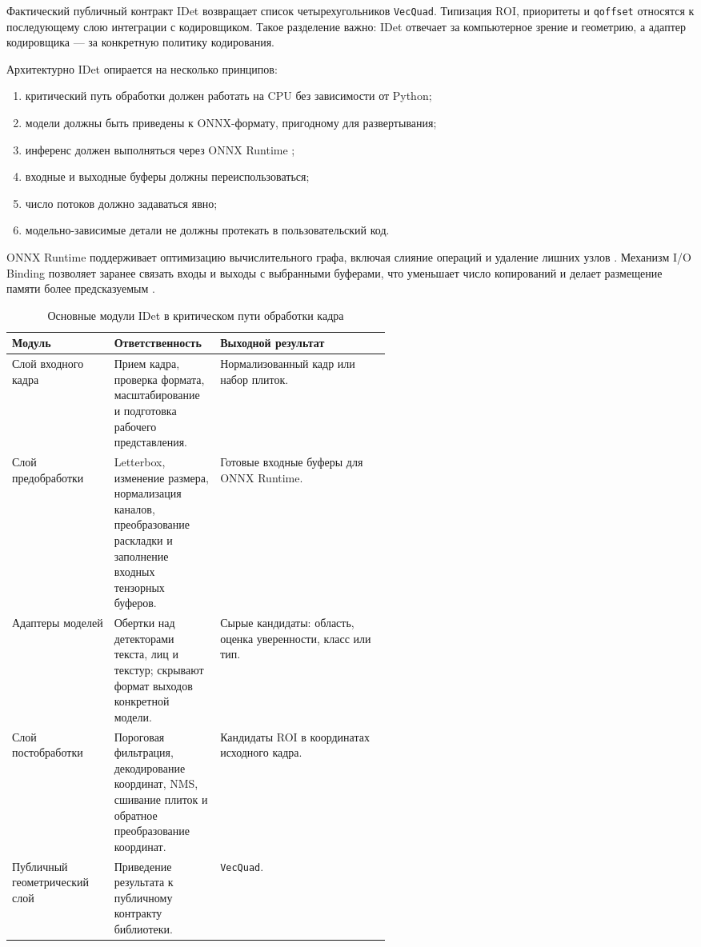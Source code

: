 \documentclass[12pt,a4paper,oneside,openany]{report}
\begin{document}
Фактический публичный контракт IDet возвращает список четырехугольников \texttt{VecQuad}. Типизация ROI, приоритеты и \texttt{qoffset} относятся к последующему слою интеграции с кодировщиком. Такое разделение важно: IDet отвечает за компьютерное зрение и геометрию, а адаптер кодировщика --- за конкретную политику кодирования.

Архитектурно IDet опирается на несколько принципов:
\begin{enumerate}[label=\arabic*)]
\item критический путь обработки должен работать на CPU без зависимости от Python;
\item модели должны быть приведены к ONNX-формату, пригодному для развертывания;
\item инференс должен выполняться через ONNX Runtime \cite{onnx,onnxruntime};
\item входные и выходные буферы должны переиспользоваться;
\item число потоков должно задаваться явно;
\item модельно-зависимые детали не должны протекать в пользовательский код.
\end{enumerate}

ONNX Runtime поддерживает оптимизацию вычислительного графа, включая слияние операций и удаление лишних узлов \cite{ort_graph_optim}. Механизм I/O Binding позволяет заранее связать входы и выходы с выбранными буферами, что уменьшает число копирований и делает размещение памяти более предсказуемым \cite{ort_iobinding}.

\begin{table}[H]\centering\caption{Основные модули IDet в критическом пути обработки кадра}\label{tab:idet_modules}\small\begin{tabularx}{\linewidth}{@{}P{0.27\linewidth}P{0.28\linewidth}Y@{}}\toprule
Модуль & Ответственность & Выходной результат \\
\midrule
Слой входного кадра & Прием кадра, проверка формата, масштабирование и подготовка рабочего представления. & Нормализованный кадр или набор плиток. \\
Слой предобработки & Letterbox, изменение размера, нормализация каналов, преобразование раскладки и заполнение входных тензорных буферов. & Готовые входные буферы для ONNX Runtime. \\
Адаптеры моделей & Обертки над детекторами текста, лиц и текстур; скрывают формат выходов конкретной модели. & Сырые кандидаты: область, оценка уверенности, класс или тип. \\
Слой постобработки & Пороговая фильтрация, декодирование координат, NMS, сшивание плиток и обратное преобразование координат. & Кандидаты ROI в координатах исходного кадра. \\
Публичный геометрический слой & Приведение результата к публичному контракту библиотеки. & \texttt{VecQuad}. \\
\bottomrule\end{tabularx}
\end{table}
\end{document}
